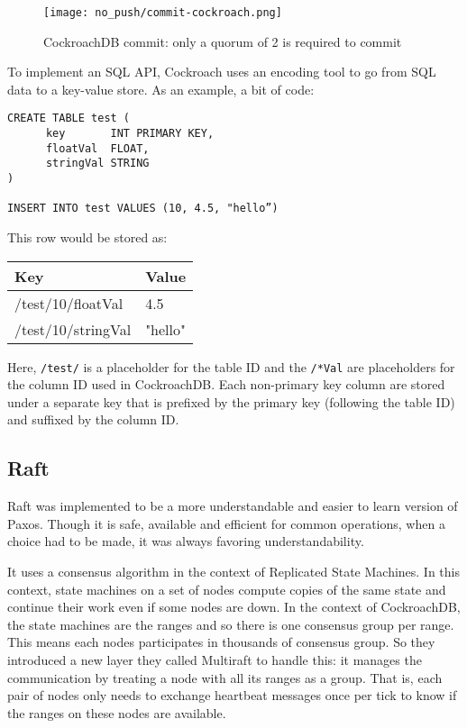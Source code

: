 \begin{figure}[H]
  \vspace{-10pt}
  \centering
  \centerline{\texttt{[image: no\_push/commit-cockroach.png]}}
  \vspace{-5pt}
  \caption{CockroachDB commit: only a quorum of 2 is required to commit }
  \vspace{-5pt}
  \label{fig:cockroachdb-commit}
\end{figure}

To implement an SQL API, Cockroach uses an encoding tool to go from SQL data to a key-value store\cite{CRDB:mapKV}. As an example, a bit of code:
\begin{verbatim}
CREATE TABLE test (
      key       INT PRIMARY KEY,
      floatVal  FLOAT,
      stringVal STRING
)

INSERT INTO test VALUES (10, 4.5, "hello”)
\end{verbatim}

This row would be stored as:

\begin{center}
\begin{tabular}{|l|l|}
\hline
Key & Value\\
\hline
/test/10/floatVal & 4.5\\
/test/10/stringVal & "hello"\\
\hline
\end{tabular}
\end{center}

Here, \verb~/test/~ is a placeholder for the table ID and the \verb~/*Val~ are placeholders for the column ID used in CockroachDB. Each non-primary key column are stored under a separate key that is prefixed by the primary key (following the table ID) and suffixed by the column ID.

\subsection{Raft}

Raft was implemented to be a more understandable and easier to learn version of Paxos\cite{DBLP:conf/usenix/OngaroO14}. Though it is safe, available and efficient for common operations, when a choice had to be made, it was always favoring understandability.


It uses a consensus algorithm in the context of Replicated State Machines. In this context, state machines on a set of nodes compute copies of the same state and continue their work even if some nodes are down. In the context of CockroachDB, the state machines are the ranges and so there is one consensus group per range. This means each nodes participates in thousands of consensus group. So they introduced a new layer they called Multiraft to handle this: it manages the communication by treating a node with all its ranges as a group. That is, each pair of nodes only needs to exchange heartbeat messages once per tick to know if the ranges on these nodes are available\cite{CRDB:multiraft}.

